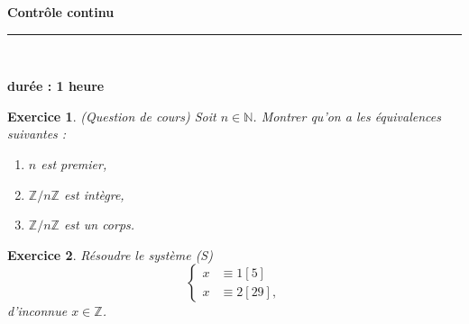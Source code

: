 \documentclass[11pt,a4paper]{article}
\title{}
\date{}
\newtheorem{ex}{Exercice}
\newcommand{\HRule}{\rule{\linewidth}{0.5mm}}
\begin{document}
\pagestyle{fancy}

\fancyhead{}
 \fancyfoot{}


\newcommand{\lb}{\llbracket}
\newcommand{\rb}{\rrbracket}
\newcommand{\N}{\mathbb{N}}
\newcommand{\Z}{\mathbb{Z}}




\newcommand{\md}[3]{#1\ \equiv \ #2 \! \! \! \! \! \pmod {#3} }
\newcommand{\nmd}[3]{#1 \not \equiv #2 \! \! \! \! \!  \pmod {#3} }
\newcommand{\mda}[3]{#1 \equiv #2 \! \!  \pmod {#3} }
\newcommand{\nmda}[3]{#1 \not \equiv #2 \! \! \pmod {#3} }
\newcommand{\mo}[2]{#1 \! \! \! \! \! \pmod #2 }
\newcommand{\moa}[2]{#1 \! \!  \pmod {#2} }

\thispagestyle{fancy}

\begin{center}
    { \huge \bfseries
    Contrôle continu
     \\ [0cm] }
    \HRule \\[0.5cm]
\end{center}






\begin{center}
\textbf{durée : 1 heure}
\end{center}


\begin{ex}(Question de cours)
Soit $n\in \N$. Montrer qu'on a les équivalences suivantes : 
\begin{enumerate}
\item $n$ est premier,

\item $\Z/n\Z$ est intègre,

\item $\Z/n\Z$ est un corps.
\end{enumerate}
\end{ex}

\begin{ex}\label{eq_modulaire}
Résoudre le système (S) \[\left\{\begin{aligned}x &\equiv 1[5]\\ 
x &\equiv  2 [29],\end{aligned}\right.\] d'inconnue $x\in \Z$. 
\end{ex}
\end{document}
